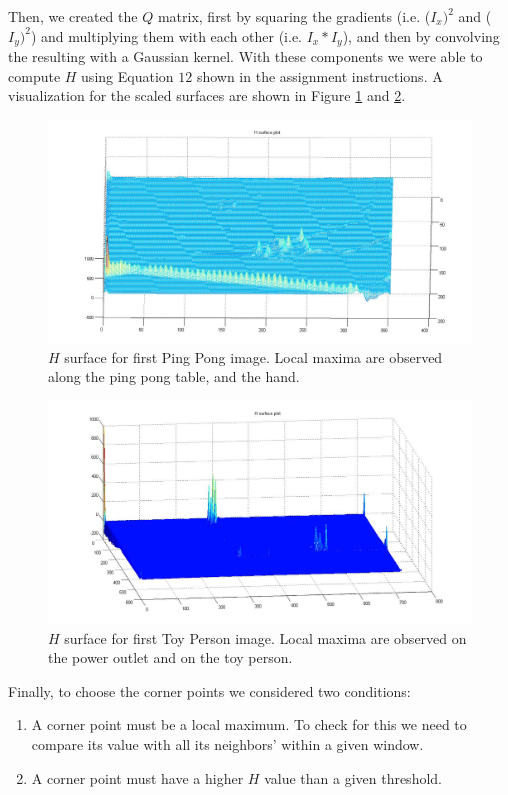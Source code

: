 \documentclass[11pt]{article}
\begin{document}
Then, we created the $Q$ matrix, first by squaring the gradients (i.e.
($I_x)^2$ and ($I_y)^2$) and multiplying them with each other (i.e. $I_x *
I_y$), and then by convolving the resulting with a Gaussian kernel. With these
components we were able to compute $H$ using Equation $12$ shown in the
assignment instructions. A visualization for the scaled surfaces are shown in
Figure \ref{fig:surface_pingpong} and \ref{fig:surface_person}.

\begin{figure}[H] \centering
	\includegraphics[width=.8\textwidth]{imgs/surface_pingpong.jpg}
	\caption{$H$ surface for first Ping Pong image. Local maxima are
		observed along the ping pong table, and the hand.}
	\label{fig:surface_pingpong}
\end{figure}

\begin{figure}[H] \centering
	\includegraphics[width=.8\textwidth]{imgs/surface_person.jpg}
	\caption{$H$ surface for first Toy Person image. Local maxima are
		observed on the power outlet and on the toy person.}
	\label{fig:surface_person}
\end{figure}

Finally, to choose the corner points we considered two conditions:
\begin{enumerate} 
	\item A corner point must be a local maximum. To check for
		this we need to compare its value with all its neighbors' within
		a given window.
	\item A corner point must have a higher $H$
		value than a given threshold.
\end{enumerate}
\end{document}
